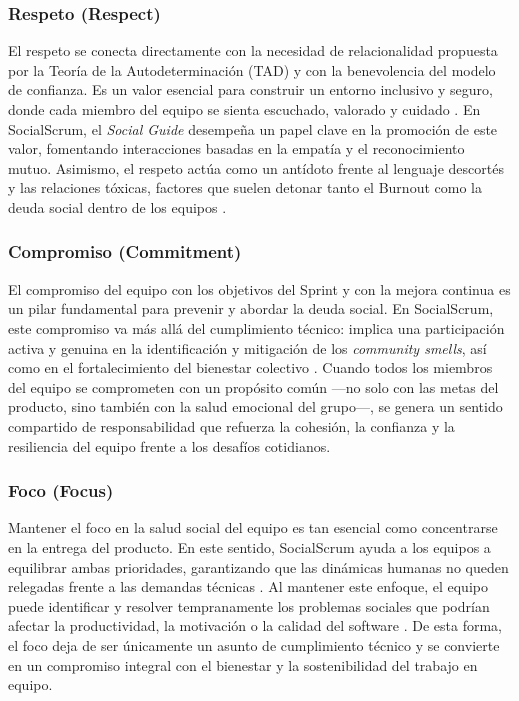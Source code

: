 \subsubsection{Respeto (Respect)}
El respeto se conecta directamente con la necesidad de relacionalidad propuesta por la Teoría de la Autodeterminación (TAD) y con la benevolencia del modelo de confianza.
Es un valor esencial para construir un entorno inclusivo y seguro, donde cada miembro del equipo se sienta escuchado, valorado y cuidado \cite{ryan_self-determination_2000}.
En SocialScrum, el \textit{Social Guide} desempeña un papel clave en la promoción de este valor, fomentando interacciones basadas en la empatía y el reconocimiento mutuo.
Asimismo, el respeto actúa como un antídoto frente al lenguaje descortés y las relaciones tóxicas, factores que suelen detonar tanto el Burnout como la deuda social dentro de los equipos \cite{tulili2022burnout}.

\subsubsection{Compromiso (Commitment)}
El compromiso del equipo con los objetivos del Sprint y con la mejora continua es un pilar fundamental para prevenir y abordar la deuda social.
En SocialScrum, este compromiso va más allá del cumplimiento técnico: implica una participación activa y genuina en la identificación y mitigación de los \textit{community smells}, así como en el fortalecimiento del bienestar colectivo \cite{caballero2022communitysmells}.
Cuando todos los miembros del equipo se comprometen con un propósito común —no solo con las metas del producto, sino también con la salud emocional del grupo—, se genera un sentido compartido de responsabilidad que refuerza la cohesión, la confianza y la resiliencia del equipo frente a los desafíos cotidianos.

\subsubsection{Foco (Focus)}
Mantener el foco en la salud social del equipo es tan esencial como concentrarse en la entrega del producto.
En este sentido, SocialScrum ayuda a los equipos a equilibrar ambas prioridades, garantizando que las dinámicas humanas no queden relegadas frente a las demandas técnicas \cite{saeeda2024nontechnicaldebt}.
Al mantener este enfoque, el equipo puede identificar y resolver tempranamente los problemas sociales que podrían afectar la productividad, la motivación o la calidad del software \cite{saeeda2024nontechnicaldebt}.
De esta forma, el foco deja de ser únicamente un asunto de cumplimiento técnico y se convierte en un compromiso integral con el bienestar y la sostenibilidad del trabajo en equipo.

